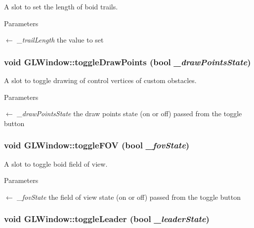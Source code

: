 A slot to set the length of boid trails. 
\begin{DoxyParams}{Parameters}
\item[\mbox{$\leftarrow$} {\em \_\-trailLength}]the value to set \end{DoxyParams}
\hypertarget{classGLWindow_a8e20f37b51be6b0d847444578c6ced2c}{
\subsubsection[{toggleDrawPoints}]{\setlength{\rightskip}{0pt plus 5cm}void GLWindow::toggleDrawPoints (bool {\em \_\-drawPointsState})}}
\label{classGLWindow_a8e20f37b51be6b0d847444578c6ced2c}


A slot to toggle drawing of control vertices of custom obstacles. 
\begin{DoxyParams}{Parameters}
\item[\mbox{$\leftarrow$} {\em \_\-drawPointsState}]the draw points state (on or off) passed from the toggle button \end{DoxyParams}
\hypertarget{classGLWindow_a9f73aec1a8fafb7511eb692fd8a5b534}{
\subsubsection[{toggleFOV}]{\setlength{\rightskip}{0pt plus 5cm}void GLWindow::toggleFOV (bool {\em \_\-fovState})}}
\label{classGLWindow_a9f73aec1a8fafb7511eb692fd8a5b534}


A slot to toggle boid field of view. 
\begin{DoxyParams}{Parameters}
\item[\mbox{$\leftarrow$} {\em \_\-fovState}]the field of view state (on or off) passed from the toggle button \end{DoxyParams}
\hypertarget{classGLWindow_a0bc4363f3a83e156cc66a7333f86abfc}{
\subsubsection[{toggleLeader}]{\setlength{\rightskip}{0pt plus 5cm}void GLWindow::toggleLeader (bool {\em \_\-leaderState})}}
\label{classGLWindow_a0bc4363f3a83e156cc66a7333f86abfc}


